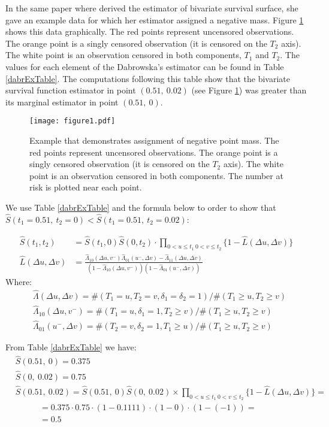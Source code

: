 \documentclass[]{article}
\begin{document}
In the same paper where \cite{dabrowska1988kaplan} derived the estimator of bivariate survival surface, she gave an example data for which her estimator assigned a negative mass. Figure \ref{fig:bubbles} shows this data graphically. The red points represent uncensored observations. The orange point is a singly censored observation (it is censored on the $T_2$ axis). The white point is an observation censored in both components, $T_1$ and $T_2$. The values for each element of the Dabrowska's estimator can be found in Table \ref{dabrExTable}. The computations following this table show that the bivariate survival function estimator in point $(0.51,~0.02)$ (see Figure \ref{fig:bubbles}) was greater than its marginal estimator in point $(0.51,~0)$.
\begin{figure}[!h]
\caption[Example that demonstrates assignment of negative point mass.]{Example that demonstrates assignment of negative point mass. The red points represent uncensored observations. The orange point is a singly censored observation (it is censored on the $T_2$ axis). The white point is an observation censored in both components. The number at risk is plotted near each point.}
\texttt{[image: figure1.pdf]}
\label{fig:bubbles}
\end{figure}

We use Table \ref{dabrExTable} and the formula below to order to show that $\hat{S}(t_1=0.51,~t_2=0) < \hat{S}(t_1=0.51,~t_2=0.02)$:

	$$
	\begin{aligned}
		\hat{S}(t_1,t_2) &= \hat{S}(t_1,0)\hat{S}(0,t_2)\cdot \prod_{{0<u\leq t_1~0<v\leq t_2}}\{1 - \hat{L}(\Delta u, \Delta v)\}\\
		\hat{L}(\Delta u, \Delta v) &= \frac{\hat{\Lambda}_{10}(\Delta u,v^-)\hat{\Lambda}_{01}(u^-,\Delta v) - \hat{\Lambda}_{11}(\Delta u, \Delta v)}{\left(1-\hat{\Lambda}_{10}(\Delta u,v^-)\right)\left(1-\hat{\Lambda}_{01}(u^-,\Delta v)\right)}
	\end{aligned}
	$$
Where:
	$$
	\begin{aligned}
	&\hat{\Lambda}(\Delta u, \Delta v) = \#(T_1=u, T_2=v, \delta_1=\delta_2=1)/\#(T_1\geq u, T_2\geq v)\\
	&\hat{\Lambda}_{10}(\Delta u, v^-) = \#(T_1=u, \delta_1=1, T_2\geq v)/\#(T_1\geq u, T_2\geq v)\\
	&\hat{\Lambda}_{01}(u^-,\Delta  v) = \#(T_2=v, \delta_2=1, T_1\geq u)/\#(T_1\geq u, T_2\geq v)
	\end{aligned}
	$$



From Table \ref{dabrExTable} we have:
	$$
	\begin{aligned}
		&\hat{S}(0.51,~0)  = 0.375\\
		&\hat{S}(0,~0.02)  = 0.75\\
		&\hat{S}(0.51,~0.02) = \hat{S}(0.51,~0)\hat{S}(0,~0.02) \times 
		\prod_{{0<u\leq t_1~0<v\leq t_2}}\{1 - \hat{L}(\Delta u, \Delta v)\}=\\
		&~~~~~~~~~~~~~= 0.375 \cdot 0.75 \cdot (1-0.1111)\cdot (1-0)\cdot (1-(-1)) = \\
		&~~~~~~~~~~~~~= 0.5
	\end{aligned}
	$$
\end{document}

